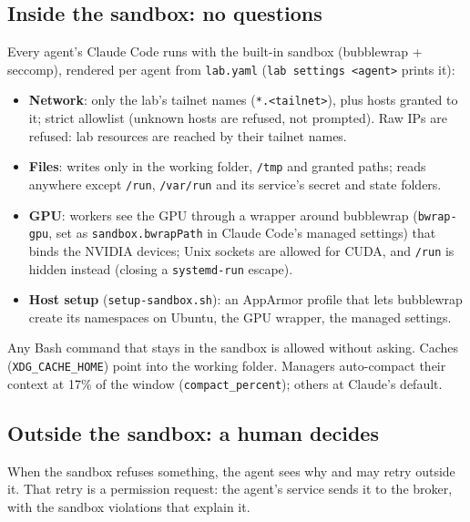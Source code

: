 \documentclass[11pt]{article}
\newcommand{\code}[1]{\texttt{#1}}
\begin{document}
\subsection{Inside the sandbox: no questions}
Every agent's Claude Code runs with the built-in sandbox (bubblewrap + seccomp), rendered
per agent from \code{lab.yaml} (\code{lab settings <agent>} prints it):
\begin{itemize}
  \item \textbf{Network}: only the lab's tailnet names (\code{*.<tailnet>}), plus hosts
    granted to it; strict allowlist (unknown hosts are refused, not prompted). Raw IPs are
    refused: lab resources are reached by their tailnet names.
  \item \textbf{Files}: writes only in the working folder, \code{/tmp} and granted paths;
    reads anywhere except \code{/run}, \code{/var/run} and its service's secret and
    state folders.
  \item \textbf{GPU}: workers see the GPU through a wrapper around bubblewrap
    (\code{bwrap-gpu}, set as \code{sandbox.bwrapPath} in Claude Code's managed settings)
    that binds the NVIDIA devices; Unix sockets are allowed for CUDA, and \code{/run} is
    hidden instead (closing a \code{systemd-run} escape).
  \item \textbf{Host setup} (\code{setup-sandbox.sh}): an AppArmor profile that lets
    bubblewrap create its namespaces on Ubuntu, the GPU wrapper, the managed settings.
\end{itemize}
Any Bash command that stays in the sandbox is allowed without asking. Caches
(\code{XDG\_CACHE\_HOME}) point into the working folder. Managers auto-compact their context
at 17\% of the window (\code{compact\_percent}); others at Claude's default.

\subsection{Outside the sandbox: a human decides}
When the sandbox refuses something, the agent sees why and may retry outside it. That
retry is a permission request: the agent's service sends it to the broker, with the
sandbox violations that explain it.
\end{document}
